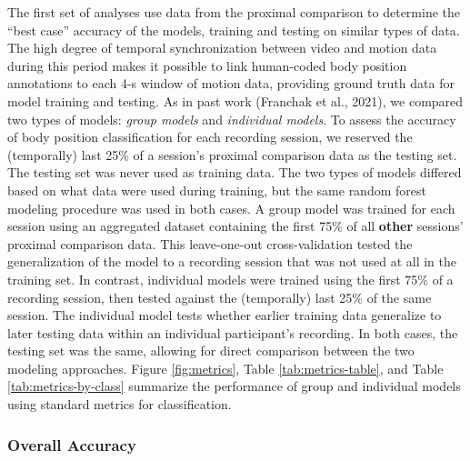 \documentclass[
  man]{apa6}
\begin{document}
The first set of analyses use data from the proximal comparison to determine the ``best case'' accuracy of the models, training and testing on similar types of data. The high degree of temporal synchronization between video and motion data during this period makes it possible to link human-coded body position annotations to each 4-s window of motion data, providing ground truth data for model training and testing. As in past work (Franchak et al., 2021), we compared two types of models: \emph{group models} and \emph{individual models}. To assess the accuracy of body position classification for each recording session, we reserved the (temporally) last 25\% of a session's proximal comparison data as the testing set. The testing set was never used as training data. The two types of models differed based on what data were used during training, but the same random forest modeling procedure was used in both cases. A group model was trained for each session using an aggregated dataset containing the first 75\% of all \textbf{other} sessions' proximal comparison data. This leave-one-out cross-validation tested the generalization of the model to a recording session that was not used at all in the training set. In contrast, individual models were trained using the first 75\% of a recording session, then tested against the (temporally) last 25\% of the same session. The individual model tests whether earlier training data generalize to later testing data within an individual participant's recording. In both cases, the testing set was the same, allowing for direct comparison between the two modeling approaches. Figure \ref{fig:metrics}, Table \ref{tab:metrics-table}, and Table \ref{tab:metrics-by-class} summarize the performance of group and individual models using standard metrics for classification.

\hypertarget{overall-accuracy}{%
\subsubsection{Overall Accuracy}\label{overall-accuracy}}
\end{document}
